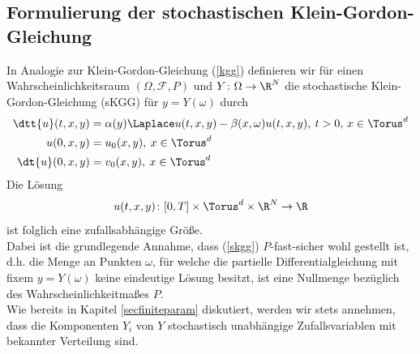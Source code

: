\subsection{Formulierung der stochastischen Klein-Gordon-Gleichung}
In Analogie zur Klein-Gordon-Gleichung (\ref{kgg}) definieren wir für einen Wahrscheinlichkeitsraum $(\Omega,\mathcal{F},P)$ und $Y\colon\Omega\to\R^N$ die stochastische Klein-Gordon-Gleichung (sKGG) für $y=Y(\omega)$ durch
\begin{align}
\label{skgg}
\dtt{u}(t,x,y)&=\alpha(y) \Laplace u(t,x,y) - \beta(x,\omega)u(t,x,y), \: t>0, \, x\in \Torus^d\\
u(0,x,y)&=u_0(x,y), \: x\in \Torus^d\\
\dt{u}(0,x,y)&=v_0(x,y), \: x\in \Torus^d
\end{align}
Die Lösung \[u(t,x,y)\colon [0,T]\times\Torus^d\times \R^N\to\R\] ist folglich eine zufallsabhängige Größe.\\
Dabei ist die grundlegende Annahme, dass (\ref{skgg}) $P$-fast-sicher wohl gestellt ist, d.h. die Menge an Punkten $\omega$, für welche die partielle Differentialgleichung mit fixem $y=Y(\omega)$ keine eindeutige Lösung besitzt, ist eine Nullmenge bezüglich des Wahrscheinlichkeitmaßes $P$.\\
Wie bereits in Kapitel \ref{secfiniteparam} diskutiert, werden wir stets annehmen, dass die Komponenten $Y_i$ von $Y$ stochastisch unabhängige Zufallsvariablen mit bekannter Verteilung sind.
